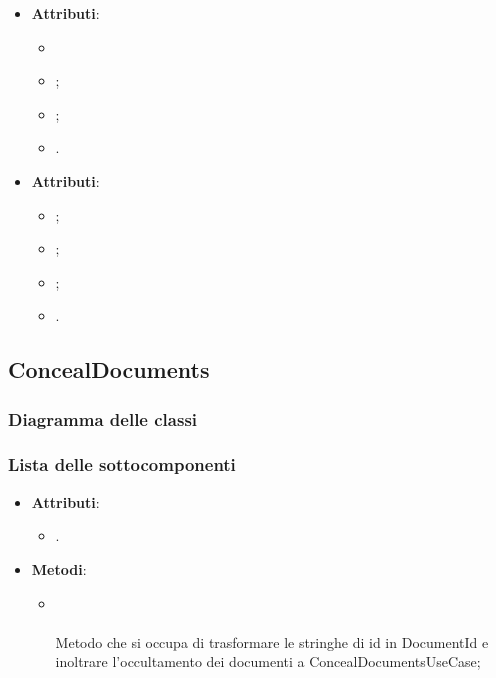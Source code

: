 \documentclass[10pt, a4paper]{article}
\begin{document}
    \label{PostgresChatDettaglio}
    \begin{itemize}
        \item \textbf{Attributi}:
        \begin{itemize}
            \item {}
            \item {};
            \item {};
            \item {}.
        \end{itemize}
    \end{itemize}
    
    \label{PostgresMessageDettaglio}
    \begin{itemize}
        \item \textbf{Attributi}:
        \begin{itemize}
            \item {};
            \item {};
            \item {};
            \item {}.
        \end{itemize}
    \end{itemize}

    \subsection{ConcealDocuments}
    \subsubsection{Diagramma delle classi}
    \subsubsection{Lista delle sottocomponenti}
    
    \label{ConcealDocumentsControllerDettaglio}
    \begin{itemize}
        \item \textbf{Attributi}:
        \begin{itemize}
            \item {}.
        \end{itemize}
        \item \textbf{Metodi}:
        \begin{itemize}
            \item {}\\ \\
            Metodo che si occupa di trasformare le stringhe di id in DocumentId e inoltrare l'occultamento dei documenti a ConcealDocumentsUseCase;
        \end{itemize}
    \end{itemize}
    
\end{document}

